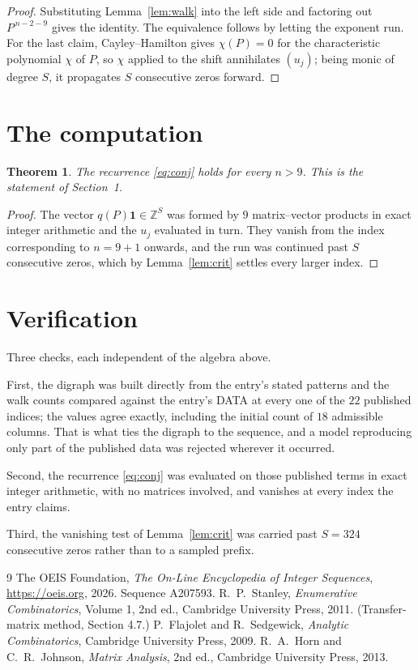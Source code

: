 \documentclass[11pt,a4paper]{article}
\theoremstyle{plain}
\newtheorem{theorem}{Theorem}
\theoremstyle{definition}
\begin{document}
\begin{proof}
Substituting Lemma~\ref{lem:walk} into the left side and factoring out
$P^{\,n-2-9}$ gives the identity. The equivalence follows by letting the exponent
run. For the last claim, Cayley--Hamilton gives $\chi(P)=0$ for the characteristic
polynomial $\chi$ of $P$, so $\chi$ applied to the shift annihilates $(u_j)$; being monic of
degree $S$, it propagates $S$ consecutive zeros forward.
\end{proof}

\section{The computation}

\begin{theorem}
The recurrence \eqref{eq:conj} holds for every $n>9$. This is the statement of
Section~1.
\end{theorem}

\begin{proof}
The vector $q(P)\mathbf{1}\in\mathbb{Z}^{S}$ was formed by $9$ matrix--vector
products in exact integer arithmetic and the $u_j$ evaluated in turn. They vanish from the
index corresponding to $n=9+1$ onwards, and the run was continued past $S$ consecutive
zeros, which by Lemma~\ref{lem:crit} settles every larger index.
\end{proof}

\section{Verification}

Three checks, each independent of the algebra above.

First, the digraph was built directly from the entry's stated patterns and the walk counts
compared against the entry's DATA at every one of the $22$ published indices; the
values agree exactly, including the initial count of $18$ admissible columns. That is
what ties the digraph to the sequence, and a model reproducing only part of the published
data was rejected wherever it occurred.

Second, the recurrence \eqref{eq:conj} was evaluated on those published terms in exact
integer arithmetic, with no matrices involved, and vanishes at every index the entry claims.

Third, the vanishing test of Lemma~\ref{lem:crit} was carried past $S=324$ consecutive
zeros rather than to a sampled prefix.

\begin{thebibliography}{9}
 The OEIS Foundation, \emph{The On-Line Encyclopedia of Integer
Sequences}, \url{https://oeis.org}, 2026. Sequence A207593.
 R.~P.~Stanley, \emph{Enumerative Combinatorics}, Volume 1, 2nd ed.,
Cambridge University Press, 2011. (Transfer-matrix method, Section 4.7.)
 P.~Flajolet and R.~Sedgewick, \emph{Analytic Combinatorics}, Cambridge
University Press, 2009.
 R.~A.~Horn and C.~R.~Johnson, \emph{Matrix Analysis}, 2nd ed., Cambridge
University Press, 2013.
\end{thebibliography}
\end{document}
